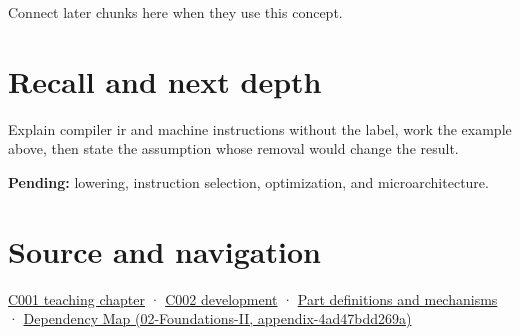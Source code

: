 Connect later chunks here when they use this concept.

\section{Recall and next depth}\label{appendix-942ad41afb30-recall-and-next-depth}

Explain compiler ir and machine instructions without the label, work the example above, then state the assumption whose removal would change the result.

\textbf{Pending:} lowering, instruction selection, optimization, and microarchitecture.

\section{Source and navigation}\label{appendix-942ad41afb30-source-and-navigation}

\href{Continuous\%20Notes/Computing\%20Foundations\%20-\%20From\%20Bits\%20to\%20C++\%20and\%20Systems\%20APIs\#From\%20a\%20signal\%20to\%20an\%20interpretation}{C001 teaching chapter} · \href{Continuous\%20Notes/Computing\%20Foundations\%20-\%20From\%20Bits\%20to\%20C++\%20and\%20Systems\%20APIs\#Arithmetic\%20becomes\%20a\%20policy}{C002 development} · \hyperref[appendix-fd090d982a15]{Part definitions and mechanisms} · \href{../02-Foundations-II/main.pdf\#nameddest=appendix-4ad47bdd269a}{Dependency Map (02-Foundations-II, appendix-4ad47bdd269a)}
